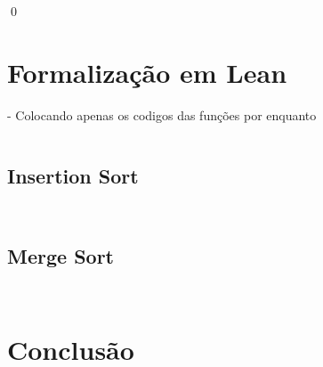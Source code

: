 \documentclass[12pt, oneside, a4paper,english,brazil]{abntex2}
\begin{document}
\qed


\chapter{Formaliza\c{c}\~ao em Lean}
- Colocando apenas os codigos das fun\c{c}\~oes por enquanto

\inputminted{lean}{declarations.lean}
\section{Insertion Sort}
\inputminted{lean}{insertion_sort.lean}
\inputminted{lean}{insertion_sort_modified.lean}

\section{Merge Sort}

\inputminted{lean}{merge_sort.lean}
\inputminted{lean}{merge_sort_modified.lean}

\chapter{Conclus\~ao}

\postextual


% 

\end{document}
